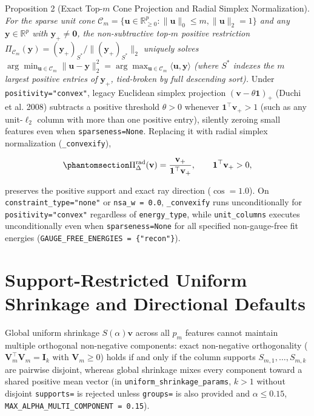 \documentclass[
  10pt,
  letterpaper,
]{report}
\newcounter{none} %
\begin{document}
Proposition 2 (Exact Top-\(m\) Cone Projection and Radial Simplex
Normalization). \emph{For the sparse unit cone
\(\mathcal{C}_m = \{\mathbf{u} \in \mathbb{R}_{\ge 0}^p : \|\mathbf{u}\|_0 \le m, \|\mathbf{u}\|_2 = 1\}\)
and any \(\mathbf{y} \in \mathbb{R}^p\) with
\(\mathbf{y}_+ \neq \mathbf{0}\), the non-subtractive top-\(m\) positive
restriction
\(\Pi_{\mathcal{C}_m}(\mathbf{y}) = (\mathbf{y}_+)_{S^*} / \|(\mathbf{y}_+)_{S^*}\|_2\)
uniquely solves
\(\arg\min_{\mathbf{u} \in \mathcal{C}_m} \|\mathbf{u} - \mathbf{y}\|_2^2 = \arg\max_{\mathbf{u} \in \mathcal{C}_m} \langle \mathbf{u}, \mathbf{y}\rangle\)
(where \(S^*\) indexes the \(m\) largest positive entries of
\(\mathbf{y}_+\), tied-broken by full descending sort).} Under
\texttt{positivity="convex"}, legacy Euclidean simplex projection
\((\mathbf{v} - \theta\mathbf{1})_+\) (Duchi et al. 2008) subtracts a
positive threshold \(\theta > 0\) whenever
\(\mathbf{1}^\top \mathbf{v}_+ > 1\) (such as any unit-\(\ell_2\) column
with more than one positive entry), silently zeroing small features even
when \texttt{sparseness=None}. Replacing it with radial simplex
normalization (\texttt{\_convexify}),

\begin{equation}\protect\phantomsection\label{eq-prop2-radial-simplex}{
\Pi_{\Delta}^{\text{rad}}(\mathbf{v}) = \frac{\mathbf{v}_+}{\mathbf{1}^\top \mathbf{v}_+}, \qquad \mathbf{1}^\top \mathbf{v}_+ > 0,
}\end{equation}

preserves the positive support and exact ray direction (\(\cos = 1.0\)).
On \texttt{constraint\_type="none"} or \texttt{nsa\_w\ =\ 0.0},
\texttt{\_convexify} runs unconditionally for
\texttt{positivity="convex"} regardless of \texttt{energy\_type}, while
\texttt{unit\_columns} executes unconditionally even when
\texttt{sparseness=None} for all specified non-gauge-free fit energies
(\texttt{GAUGE\_FREE\_ENERGIES\ =\ \{"recon"\}}).

\section{Support-Restricted Uniform Shrinkage and Directional
Defaults}\label{sec-uniform-shrinkage}

Global uniform shrinkage \(S(\alpha)\mathbf{v}\) across all \(p_m\)
features cannot maintain multiple orthogonal non-negative components:
exact non-negative orthogonality
(\(\mathbf{V}_m^\top \mathbf{V}_m = \mathbf{I}_k\) with
\(\mathbf{V}_m \ge 0\)) holds if and only if the column supports
\(S_{m,1}, \dots, S_{m,k}\) are pairwise disjoint, whereas global
shrinkage mixes every component toward a shared positive mean vector (in
\texttt{uniform\_shrinkage\_params}, \(k > 1\) without disjoint
\texttt{supports=} is rejected unless \texttt{groups=} is also provided
and \(\alpha \le 0.15\),
\texttt{MAX\_ALPHA\_MULTI\_COMPONENT\ =\ 0.15}).
\end{document}

